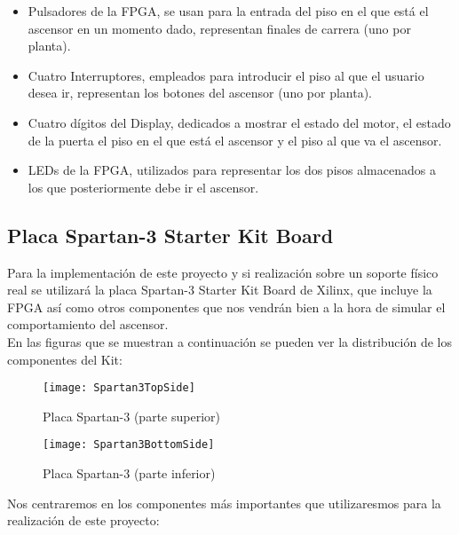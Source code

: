 \begin{itemize}
\begin{itemize}
     	   	\item Pulsadores de la FPGA, se usan para la entrada del piso en el que está el ascensor en un momento dado, representan finales de carrera (uno por planta).
    		    \item Cuatro Interruptores, empleados para introducir el piso al que el usuario desea ir, representan los botones del ascensor (uno por planta).
    		    \item Cuatro dígitos del Display, dedicados a mostrar el estado del motor, el estado de la puerta el piso en el que está el ascensor y el piso al que va el ascensor.
    		    \item LEDs de la FPGA, utilizados para representar los dos pisos almacenados a los que posteriormente debe ir el ascensor.
    	\end{itemize}
	\end{itemize}

\subsection{Placa Spartan-3 Starter Kit Board} \label{subsection:Spartan-3}
    
    Para la implementación de este proyecto y si realización sobre un soporte físico real se utilizará la placa Spartan-3 Starter Kit Board de Xilinx, que incluye la FPGA así como otros componentes que nos vendrán bien a la hora de simular el comportamiento del ascensor. \\ 

    En las figuras que se muestran a continuación se pueden ver la distribución de los componentes del Kit:

    \begin{figure}[H]
            \centering
            \texttt{[image: Spartan3TopSide]}
            \caption{Placa Spartan-3 (parte superior)}
            \label{fig:Spartan3TopSide}
    \end{figure}

    \begin{figure}[H]
            \centering
            \texttt{[image: Spartan3BottomSide]}
            \caption{Placa Spartan-3 (parte inferior)}
            \label{fig:Spartan3BottomSide}
    \end{figure}

    Nos centraremos en los componentes más importantes que utilizaresmos para la realización de este proyecto:

